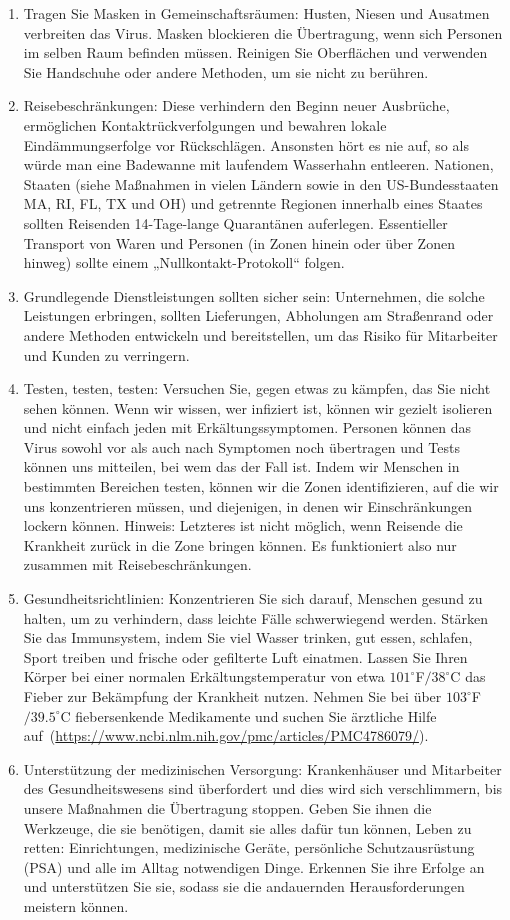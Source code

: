 \documentclass[onecolumn,journal]{IEEEtran}
\begin{document}
\begin{multicols}{2}
\begin{enumerate}
\item Tragen Sie Masken in Gemeinschaftsräumen: Husten, Niesen und Ausatmen verbreiten das Virus. Masken blockieren die Übertragung, wenn sich Personen im selben Raum befinden müssen. Reinigen Sie Oberflächen und verwenden Sie Handschuhe oder andere Methoden, um sie nicht zu berühren. 
\item Reisebeschränkungen: Diese verhindern den Beginn neuer Ausbrüche, ermöglichen Kontaktrückverfolgungen und bewahren lokale Eindämmungserfolge vor Rückschlägen. Ansonsten hört es nie auf, so als würde man eine Badewanne mit laufendem Wasserhahn entleeren. Nationen, Staaten (siehe Maßnahmen in vielen Ländern sowie in den US-Bundesstaaten MA, RI, FL, TX und OH) und getrennte Regionen innerhalb eines Staates sollten Reisenden 14-Tage-lange Quarantänen auferlegen. Essentieller Transport von Waren und Personen (in Zonen hinein oder über Zonen hinweg) sollte einem „Nullkontakt-Protokoll“ folgen.
\item Grundlegende Dienstleistungen sollten sicher sein: Unternehmen, die solche Leistungen erbringen, sollten Lieferungen, Abholungen am Straßenrand oder andere Methoden entwickeln und bereitstellen, um das Risiko für Mitarbeiter und Kunden zu verringern.
\item Testen, testen, testen: Versuchen Sie, gegen etwas zu kämpfen, das Sie nicht sehen können. Wenn wir wissen, wer infiziert ist, können wir gezielt isolieren und nicht einfach jeden mit Erkältungssymptomen. Personen können das Virus sowohl vor als auch nach Symptomen noch übertragen und Tests können uns mitteilen, bei wem das der Fall ist. Indem wir Menschen in bestimmten Bereichen testen, können wir die Zonen identifizieren, auf die wir uns konzentrieren müssen, und diejenigen, in denen wir Einschränkungen lockern können. Hinweis: Letzteres ist nicht möglich, wenn Reisende die Krankheit zurück in die Zone bringen können. Es funktioniert also nur zusammen mit Reisebeschränkungen.
\item Gesundheitsrichtlinien: Konzentrieren Sie sich darauf, Menschen gesund zu halten, um zu verhindern, dass leichte Fälle schwerwiegend werden. Stärken Sie das Immunsystem, indem Sie viel Wasser trinken, gut essen, schlafen, Sport treiben und frische oder gefilterte Luft einatmen. Lassen Sie Ihren Körper bei einer normalen Erkältungstemperatur von etwa $101^\circ$F$/38^\circ$C das Fieber zur Bekämpfung der Krankheit nutzen. Nehmen Sie bei über $103^\circ$F$/39.5^\circ$C fiebersenkende Medikamente und suchen Sie ärztliche Hilfe auf~(\url{https://www.ncbi.nlm.nih.gov/pmc/articles/PMC4786079/}).
\item Unterstützung der medizinischen Versorgung: Krankenhäuser und Mitarbeiter des Gesundheitswesens sind überfordert und dies wird sich verschlimmern, bis unsere Maßnahmen die Übertragung stoppen. Geben Sie ihnen die Werkzeuge, die sie benötigen, damit sie alles dafür tun können, Leben zu retten: Einrichtungen, medizinische Geräte, persönliche Schutzausrüstung (PSA) und alle im Alltag notwendigen Dinge. Erkennen Sie ihre Erfolge an und unterstützen Sie sie, sodass sie die andauernden Herausforderungen meistern können.
\end{enumerate}


\end{multicols}
\end{document}
